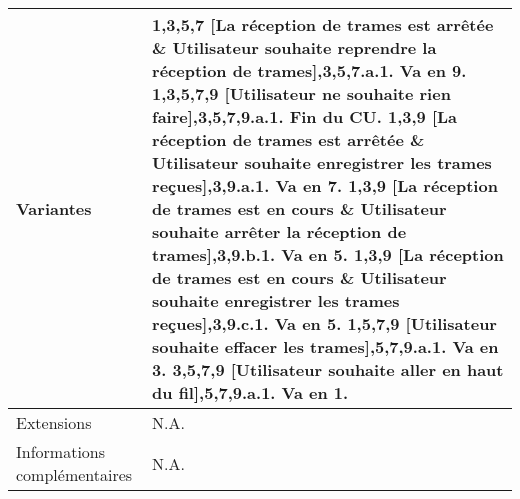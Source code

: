\begin{longtable}[l]{|p{3cm}|p{11.7cm}|}
        Variantes & \newline
            \textbf{1,3,5,7 [La réception de trames est arrêtée \& Utilisateur souhaite reprendre la réception de trames]}\newline
                1,3,5,7.a.1. Va en 9. \newline
            \newline
            \textbf{1,3,5,7,9 [Utilisateur ne souhaite rien faire]}\newline
                1,3,5,7,9.a.1. Fin du CU. \newline
            \newline
            \textbf{1,3,9 [La réception de trames est arrêtée \& Utilisateur souhaite enregistrer les trames reçues]}\newline
                1,3,9.a.1. Va en 7. \newline
            \newline
            \textbf{1,3,9 [La réception de trames est en cours \& Utilisateur souhaite arrêter la réception de trames]}\newline
                1,3,9.b.1. Va en 5. \newline
            \newline
            \textbf{1,3,9 [La réception de trames est en cours \& Utilisateur souhaite enregistrer les trames reçues]}\newline
                1,3,9.c.1. Va en 5. \newline
            \newline
            \textbf{1,5,7,9 [Utilisateur souhaite effacer les trames]}\newline
                1,5,7,9.a.1. Va en 3. \newline
            \newline
            \textbf{3,5,7,9 [Utilisateur souhaite aller en haut du fil]}\newline
                3,5,7,9.a.1. Va en 1. \newline
            \\
    \hline

        Extensions & N.A. \\
    \hline
    Informations \newline complémentaires & N.A. \\
    \hline
\end{longtable}